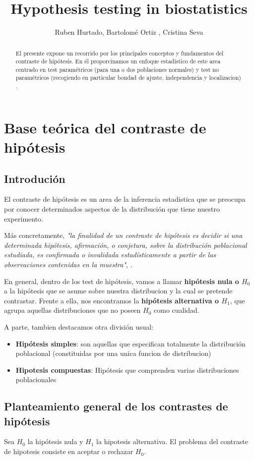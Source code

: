 \documentclass[a4paper,12pt]{article}
\title{Hypothesis testing in biostatistics}
\author{Ruben Hurtado, Bartolomé Ortiz , Cristina Seva }
\begin{document}
\maketitle

\begin{abstract}
El presente expone un recorrido por los principales conceptos y fundamentos del contraste de hipótesis. En él proporcinamos un enfoque estadístico de este area centrado en test paramétricos (para una o dos poblaciones normales) y test no paramétricos (recogiendo en particular bondad de ajuste, independencia y localizacion) . 
\end{abstract}


\section{Base teórica del contraste de hipótesis}
\subsection{Introdución}
El contraste de hipótesis es un area de la inferencia estadistica que se preocupa por conocer determinados aspectos de la distribución que tiene nuestro experimento.

Más concretamente, \textit{"la finalidad de un contraste de hipótesis es decidir si una determinada hipótesis, afirmación, o conjetura, sobre la distribución poblacional estudiada, es confirmada o invalidada estadísticamente a partir de las observaciones contenidas en la muestra"}, \cite{velez1993principios}.

En general, dentro de los test de hipótesis, vamos a llamar \textbf{hipótesis nula o $H_0$} a la hipótesis que se asume sobre nuestra distribucion y la cual se pretende contrastar. Frente a ella, nos encontramos la \textbf{hipótesis alternativa o $H_1$}, que agrupa aquellas distribuciones que no poseen $H_0$ como cualidad.

A parte, tambien destacamos otra división usual:
\begin{itemize}
	\item \textbf{Hipótesis simples}: son aquellas que especifican totalmente la distribución poblacional (constituidas por una unica funcion de distribucion)
	\item \textbf{Hipotesis compuestas}: Hipótesis  que comprenden varias distribuciones poblacionales 
\end{itemize}

\subsection{Planteamiento general de los contrastes de hipótesis}
Sea $H_0$ la hipótesis nula y $H_1$ la hipotesis alternativa. El problema del contraste de hipotesis consiste en aceptar o rechazar $H_0$.
\end{document}
